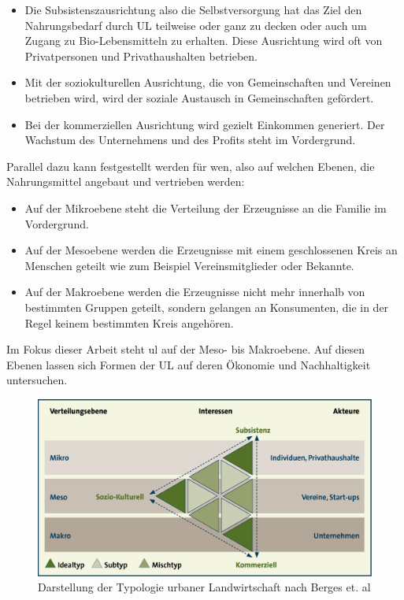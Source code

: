 \documentclass{scrartcl}
\begin{document}
\begin{itemize}
\item Die Subsistenszausrichtung also die Selbstversorgung hat das Ziel den Nahrungsbedarf durch UL teilweise oder ganz zu decken oder auch um Zugang zu Bio-Lebensmitteln zu erhalten. Diese Ausrichtung wird oft von Privatpersonen und Privathaushalten betrieben. 
\item Mit der soziokulturellen Ausrichtung, die von Gemeinschaften und Vereinen betrieben wird, wird der soziale Austausch in Gemeinschaften gefördert. 
\item Bei der kommerziellen Ausrichtung wird gezielt Einkommen generiert. Der Wachstum des Unternehmens und des Profits steht im Vordergrund. 
\end{itemize}

Parallel dazu kann festgestellt werden für wen, also auf welchen Ebenen, die Nahrungsmittel angebaut und vertrieben werden:

\begin{itemize}
\item Auf der Mikroebene steht die Verteilung der Erzeugnisse an die Familie im Vordergrund.
\item Auf der Mesoebene werden die Erzeugnisse mit einem geschlossenen Kreis an Menschen geteilt wie zum Beispiel Vereinsmitglieder oder Bekannte.
\item Auf der Makroebene werden die Erzeugnisse nicht mehr innerhalb von bestimmten Gruppen geteilt, sondern gelangen an Konsumenten, die in der Regel keinem bestimmten Kreis angehören. 
\end{itemize}

Im Fokus dieser Arbeit steht \acs{ul} auf der Meso- bis Makroebene. Auf diesen Ebenen lassen sich Formen der UL auf deren Ökonomie und Nachhaltigkeit untersuchen.

\begin{figure}[htbp]
\centering
\includegraphics[width=12cm]{image_folder/ul_typologie.png}
\caption{Darstellung der Typologie urbaner Landwirtschaft nach Berges et. al}
\label{fig:ul_typologie}
\end{figure}
\end{document}
